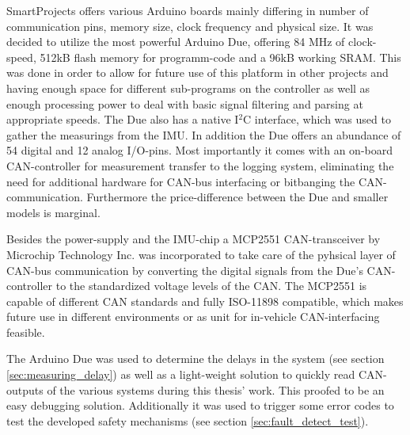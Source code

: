 \documentclass[ExampleMasters.tex]{subfiles}
\begin{document}
SmartProjects offers various Arduino boards mainly differing in number of communication pins, memory size, clock frequency and physical size. It was decided to utilize the most powerful Arduino Due, offering 84 MHz of clock-speed, 512kB flash memory for programm-code and a 96kB working SRAM. This was done in order to allow for future use of this platform in other projects and having enough space for different sub-programs on the controller as well as enough processing power to deal with basic signal filtering and parsing at appropriate speeds. The Due also has a native I$^{2}$C interface, which was used to gather the measurings from the IMU. In addition the Due offers an abundance of 54 digital and 12 analog I/O-pins. Most importantly it comes with an on-board CAN-controller for measurement transfer to the logging system, eliminating the need for additional hardware for CAN-bus interfacing or bitbanging the CAN-communication. Furthermore the price-difference between the Due and smaller models is marginal. 

Besides the power-supply and the IMU-chip a MCP2551 CAN-transceiver by Microchip Technology Inc. was incorporated to take care of the pyhsical layer of CAN-bus communication by converting the digital signals from the Due's CAN-controller to the standardized voltage levels of the CAN. The MCP2551 is capable of different CAN standards and fully ISO-11898 compatible, which makes future use in different environments or as unit for in-vehicle CAN-interfacing feasible.

The Arduino Due was used to determine the delays in the system (see section \ref{sec:measuring_delay}) as well as a light-weight solution to quickly read CAN-outputs of the various systems during this thesis' work. This proofed to be an easy debugging solution. Additionally it was used to trigger some error codes to test the developed safety mechanisms (see section \ref{sec:fault_detect_test}). 

\end{document}
